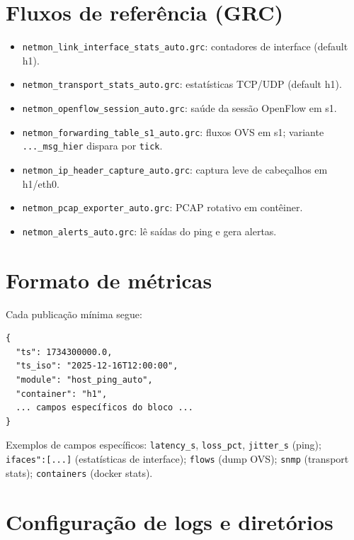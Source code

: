 \documentclass[11pt,a4paper]{article}
\begin{document}
\section{Fluxos de referência (GRC)}
\begin{itemize}[leftmargin=1.5em]
  \item \texttt{netmon_link_interface_stats_auto.grc}: contadores de interface (default h1).
  \item \texttt{netmon_transport_stats_auto.grc}: estatísticas TCP/UDP (default h1).
  \item \texttt{netmon_openflow_session_auto.grc}: saúde da sessão OpenFlow em s1.
  \item \texttt{netmon_forwarding_table_s1_auto.grc}: fluxos OVS em s1; variante \texttt{..._msg_hier} dispara por \texttt{tick}.
  \item \texttt{netmon_ip_header_capture_auto.grc}: captura leve de cabeçalhos em h1/eth0.
  \item \texttt{netmon_pcap_exporter_auto.grc}: PCAP rotativo em contêiner.
  \item \texttt{netmon_alerts_auto.grc}: lê saídas do ping e gera alertas.
\end{itemize}

\section{Formato de métricas}
Cada publicação mínima segue:
\begin{verbatim}
{
  "ts": 1734300000.0,
  "ts_iso": "2025-12-16T12:00:00",
  "module": "host_ping_auto",
  "container": "h1",
  ... campos específicos do bloco ...
}
\end{verbatim}
Exemplos de campos específicos: \texttt{latency_s}, \texttt{loss_pct}, \texttt{jitter_s} (ping); \texttt{ifaces":[{...}]} (estatísticas de interface); \texttt{flows} (dump OVS); \texttt{snmp} (transport stats); \texttt{containers} (docker stats).

\section{Configuração de logs e diretórios}
\end{document}
